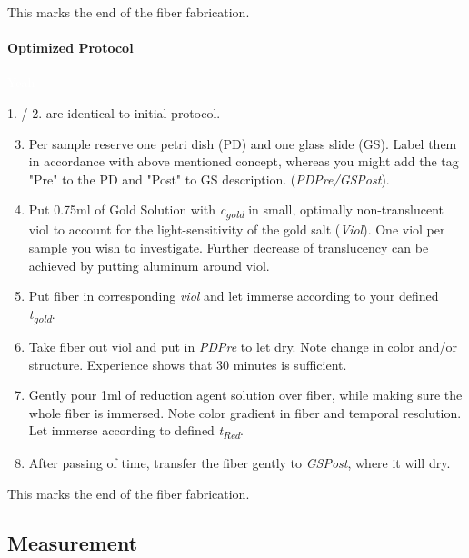     \begin{center}
        This marks the end of the fiber fabrication.
    \end{center}


\paragraph{Optimized Protocol}\textcolor{white}{Yeah}\nextline[0.05cm]

1. / 2. are identical to initial protocol.

\begin{enumerate}
\setcounter{enumi}{2}
    
    \item Per sample reserve one petri dish (PD) and one glass slide (GS). Label them in accordance with above mentioned concept, whereas you might add the tag "Pre" to the PD and "Post" to GS description. (\textit{PDPre/GSPost}).
    
    \item Put 0.75ml of Gold Solution with \textit{c\textsubscript{gold}} in small, optimally non-translucent viol to account for the light-sensitivity of the gold salt (\textit{Viol}). One viol per sample you wish to investigate. Further decrease of translucency can be achieved by putting aluminum around viol.
    
    \item Put fiber in corresponding \textit{viol} and let immerse according to your defined \textit{t\textsubscript{gold}}.
    \item Take fiber out viol and put in \textit{PDPre} to let dry. Note change in color and/or structure. Experience shows that 30 minutes is sufficient.
    
    \item Gently pour 1ml of reduction agent solution over fiber, while making sure the whole fiber is immersed. Note color gradient in fiber and temporal resolution. Let immerse according to defined \textit{t\textsubscript{Red}}.
    
    \item After passing of time, transfer the fiber gently to \textit{GSPost}, where it will dry.
    \end{enumerate}
    
    \begin{center}
        This marks the end of the fiber fabrication.
    \end{center}


\subsection{Measurement}
